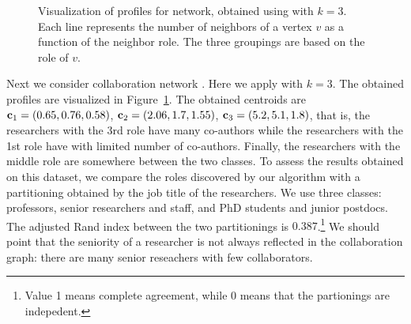 \begin{figure}[ht!]
\caption{Visualization of profiles for \collab network, obtained using \alginitdeg with $k = 3$.
Each line represents the number of neighbors of a vertex $v$ as a
function of the neighbor role. The three groupings are based on the role of $v$.}
\label{fig:collab}
\end{figure}


Next we consider collaboration network \collab. Here we apply \alginitdeg
with $k = 3$. The obtained profiles are visualized in Figure~\ref{fig:collab}.
The obtained centroids are
$\mathbf{c}_1 = (0.65, 0.76, 0.58)$, $\mathbf{c}_2 = (2.06, 1.7, 1.55)$, $\mathbf{c}_3 = (5.2, 5.1, 1.8)$, 
that is, the researchers with the 3rd role have many co-authors while the researchers with the 1st role
have with limited number of co-authors. 
Finally, the researchers with the middle role are somewhere between
the two classes. 
To assess the results obtained on this dataset,
we compare the roles discovered by our algorithm
with a partitioning obtained by the job title of the researchers.
We use three classes: professors, senior researchers and staff, and PhD students and junior postdocs. 
The adjusted Rand index between the two partitionings is $0.387$.\footnote{Value 1 means complete agreement, 
while 0 means that the partionings are indepedent.}
We should point that the seniority of a researcher is not always reflected in the collaboration graph: 
there are many senior reseachers with few collaborators. 


